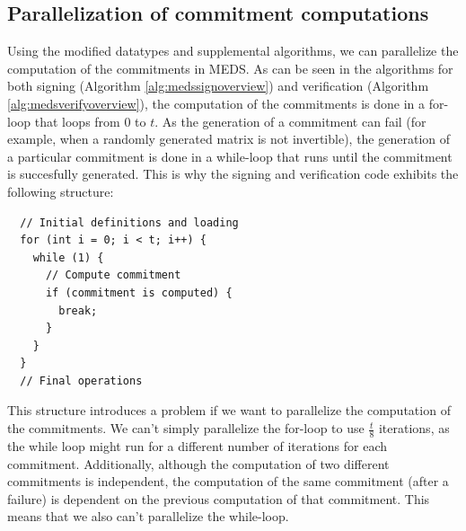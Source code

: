\documentclass[11pt,a4paper]{report}
\theoremstyle{definition}
\begin{document}
\subsection{Parallelization of commitment computations}
\label{sec:commitmentparallelization}
Using the modified datatypes and supplemental algorithms, we can parallelize the computation of the commitments in MEDS. As can be seen in the algorithms for both signing (Algorithm \ref{alg:medssignoverview}) and verification (Algorithm \ref{alg:medsverifyoverview}), the computation of the commitments is done in a for-loop that loops from $0$ to $t$. As the generation of a commitment can fail (for example, when a randomly generated matrix is not invertible), the generation of a particular commitment is done in a while-loop that runs until the commitment is succesfully generated. This is why the signing and verification code exhibits the following structure:
\begin{verbatim}
  // Initial definitions and loading
  for (int i = 0; i < t; i++) {
    while (1) {
      // Compute commitment
      if (commitment is computed) {
        break;
      }
    }
  }
  // Final operations
\end{verbatim}
This structure introduces a problem if we want to parallelize the computation of the commitments. We can't simply parallelize the for-loop to use $\frac{t}{8}$ iterations, as the while loop might run for a different number of iterations for each commitment. Additionally, although the computation of two different commitments is independent, the computation of the same commitment (after a failure) is dependent on the previous computation of that commitment. This means that we also can't parallelize the while-loop.
\end{document}
